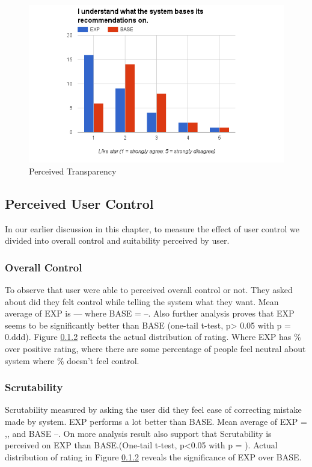 \begin{figure}[h]
	\centering
	\includegraphics[width=1\linewidth]{figures/ch5_stat_transpancy.png}
	\caption{Perceived Transparency}
	\label{fig:ch5_stat_transpancy}
\end{figure}
\subsection{Perceived User Control}

In our earlier discussion in this chapter, to measure the effect of user control we divided into overall control and suitability perceived by user. 

\subsubsection{Overall Control}

To observe that user were able to perceived overall control or not. They asked about did they felt control while telling the system what they want.  Mean average of EXP is --- where BASE = --. Also further analysis proves that EXP seems to be significantly better than BASE (one-tail t-test, p> 0.05 with p = 0.ddd). Figure \ref{} reflects the actual distribution of rating. Where EXP has \% over positive rating, where there are some percentage of people feel neutral about system where \% doesn’t feel control. 

\subsubsection{Scrutability}

Scrutability measured by asking the user did they feel ease of correcting mistake made by system. EXP performs a lot better than BASE. Mean average of EXP = ,, and BASE --. On more analysis result also support that Scrutability is perceived on EXP than BASE.(One-tail t-test, p<0.05 with p = ). 
Actual distribution of rating in Figure \ref{} reveals the significance of EXP over BASE. 


